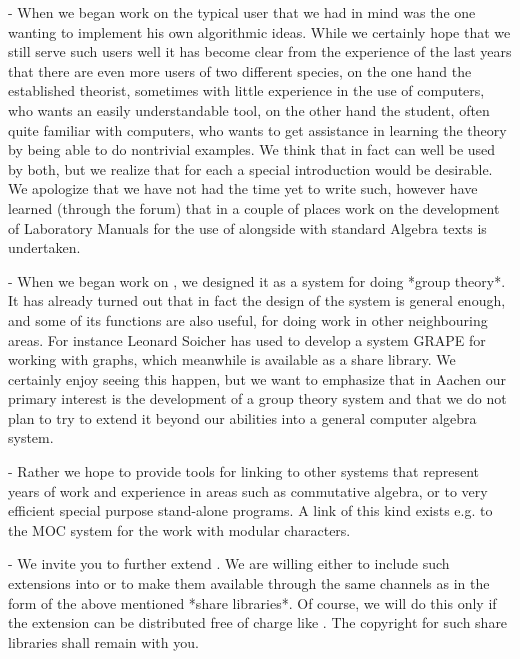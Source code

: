 \beginlist
  \item{-}
    When we began work on {\GAP} the typical user that we had in mind was
    the  one wanting to  implement his own  algorithmic  ideas.  While we
    certainly  hope  that we still serve  such  users well it  has become
    clear from the experience of the last  years that there are even more
    users  of  two different species,  on the  one   hand the established
    theorist,  sometimes with little experience  in the use of computers,
    who wants   an  easily understandable tool, on   the   other hand the
    student,   often quite  familiar with  computers,   who wants to  get
    assistance  in learning the theory   by  being able to do  nontrivial
    examples.  We think that in fact {\GAP} can well be used by both, but
    we realize  that for each a  special introduction would be desirable.
    We apologize that we have not had the time yet to write such, however
    have learned (through the  {\GAP} forum) that in  a couple  of places
    work on the  development of Laboratory Manuals for  the use of {\GAP}
    alongside with standard Algebra texts is undertaken.

  \item{-}
    When we began  work on {\GAP}, we designed  it as a system for  doing
    *group theory*.  It has already turned out that in fact the design of
    the system is general  enough,  and some  of  its functions are  also
    useful,  for  doing work in  other  neighbouring areas.  For instance
    Leonard  Soicher has used {\GAP} to  develop a system {\sf GRAPE} for
    working with graphs, which meanwhile is available as a share library.
    We certainly enjoy seeing this happen, but we  want to emphasize that
    in Aachen our  primary interest is the development  of a group theory
    system and that    we do not plan  to   try to extend it  beyond  our
    abilities into a general computer algebra system.

  \item{-}
    Rather  we hope to provide tools  for linking {\GAP} to other systems
    that  represent years  of  work  and  experience   in areas  such  as
    commutative algebra, or to very efficient special purpose stand-alone
    programs.  A link of this kind exists e.g.  to the MOC system for the
    work with modular characters.

  \item{-}
    We invite you  to further extend   {\GAP}.  We are willing either  to
    include such extensions into {\GAP} or to make them available through
    the same channels as {\GAP} in the form of the above mentioned *share
    libraries*.  Of course, we will do this  only if the extension can be
    distributed free of charge like {\GAP}.  The copyright for such share
    libraries shall remain with you.

